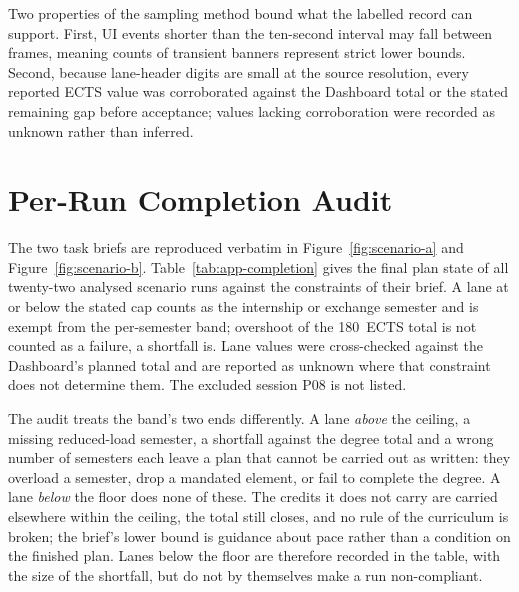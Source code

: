 Two properties of the sampling method bound what the labelled record can support. First, UI events shorter than the ten-second interval may fall between frames, meaning counts of transient banners represent strict lower bounds. Second, because lane-header digits are small at the source resolution, every reported ECTS value was corroborated against the Dashboard total or the stated remaining gap before acceptance; values lacking corroboration were recorded as unknown rather than inferred.

\section{Per-Run Completion Audit}
\label{app:eval-completion}

The two task briefs are reproduced verbatim in Figure~\ref{fig:scenario-a} and Figure~\ref{fig:scenario-b}. Table~\ref{tab:app-completion} gives the final plan state of all twenty-two analysed scenario runs against the constraints of their brief. A lane at or below the stated cap counts as the internship or exchange semester and is exempt from the per-semester band; overshoot of the 180~ECTS total is not counted as a failure, a shortfall is. Lane values were cross-checked against the Dashboard's planned total and are reported as unknown where that constraint does not determine them. The excluded session P08 is not listed.

The audit treats the band's two ends differently. A lane \emph{above} the ceiling, a missing reduced-load semester, a shortfall against the degree total and a wrong number of semesters each leave a plan that cannot be carried out as written: they overload a semester, drop a mandated element, or fail to complete the degree. A lane \emph{below} the floor does none of these. The credits it does not carry are carried elsewhere within the ceiling, the total still closes, and no rule of the curriculum is broken; the brief's lower bound is guidance about pace rather than a condition on the finished plan. Lanes below the floor are therefore recorded in the table, with the size of the shortfall, but do not by themselves make a run non-compliant.

